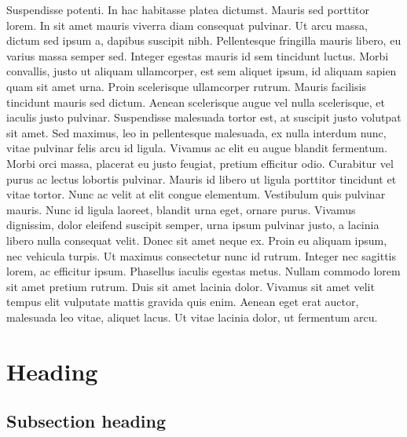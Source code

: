 \documentclass[12pt,a4paper,twoside, twocolumn]{article}
\begin{document}
Suspendisse potenti. In hac habitasse platea dictumst. Mauris sed porttitor lorem. In sit amet mauris viverra diam consequat pulvinar. Ut arcu massa, dictum sed ipsum a, dapibus suscipit nibh. Pellentesque fringilla mauris libero, eu varius massa semper sed. Integer egestas mauris id sem tincidunt luctus. Morbi convallis, justo ut aliquam ullamcorper, est sem aliquet ipsum, id aliquam sapien quam sit amet urna. Proin scelerisque ullamcorper rutrum. Mauris facilisis tincidunt mauris sed dictum. Aenean scelerisque augue vel nulla scelerisque, et iaculis justo pulvinar. Suspendisse malesuada tortor est, at suscipit justo volutpat sit amet. Sed maximus, leo in pellentesque malesuada, ex nulla interdum nunc, vitae pulvinar felis arcu id ligula. Vivamus ac elit eu augue blandit fermentum. Morbi orci massa, placerat eu justo feugiat, pretium efficitur odio. Curabitur vel purus ac lectus lobortis pulvinar. 
Mauris id libero ut ligula porttitor tincidunt et vitae tortor. Nunc ac velit at elit congue elementum. Vestibulum quis pulvinar mauris. Nunc id ligula laoreet, blandit urna eget, ornare purus. Vivamus dignissim, dolor eleifend suscipit semper, urna ipsum pulvinar justo, a lacinia libero nulla consequat velit. Donec sit amet neque ex. Proin eu aliquam ipsum, nec vehicula turpis. Ut maximus consectetur nunc id rutrum. Integer nec sagittis lorem, ac efficitur ipsum. Phasellus iaculis egestas metus. Nullam commodo lorem sit amet pretium rutrum. Duis sit amet lacinia dolor. Vivamus sit amet velit tempus elit vulputate mattis gravida quis enim. Aenean eget erat auctor, malesuada leo vitae, aliquet lacus. Ut vitae lacinia dolor, ut fermentum arcu. 


\section{Heading}
 
\subsection{Subsection heading}
\end{document}
